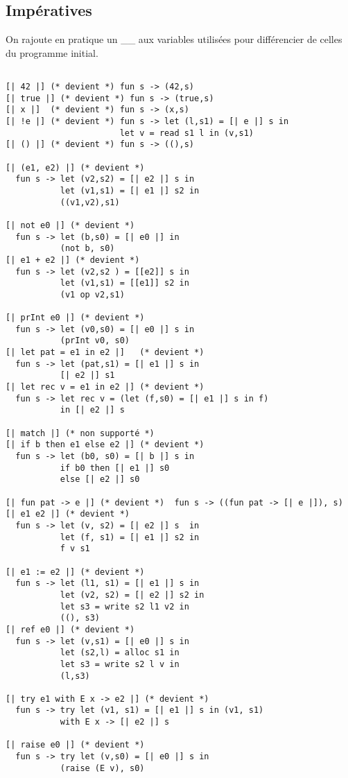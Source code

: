 \documentclass{article}
\newcommand\code[1]{{\fontfamily{lmtt}\selectfont #1}}
\begin{document}
\subsection{Impératives}

	On rajoute en pratique un \code{\_\_} aux variables utilisées pour différencier de celles du programme initial.
	
	\begin{verbatim}

[| 42 |] (* devient *) fun s -> (42,s)
[| true |] (* devient *) fun s -> (true,s)
[| x |]  (* devient *) fun s -> (x,s)
[| !e |] (* devient *) fun s -> let (l,s1) = [| e |] s in
                       let v = read s1 l in (v,s1)
[| () |] (* devient *) fun s -> ((),s)

[| (e1, e2) |] (* devient *) 
  fun s -> let (v2,s2) = [| e2 |] s in
           let (v1,s1) = [| e1 |] s2 in
           ((v1,v2),s1)

[| not e0 |] (* devient *) 
  fun s -> let (b,s0) = [| e0 |] in
           (not b, s0)
[| e1 + e2 |] (* devient *) 
  fun s -> let (v2,s2 ) = [[e2]] s in
           let (v1,s1) = [[e1]] s2 in
           (v1 op v2,s1)

[| prInt e0 |] (* devient *) 
  fun s -> let (v0,s0) = [| e0 |] s in
           (prInt v0, s0)
[| let pat = e1 in e2 |]   (* devient *) 
  fun s -> let (pat,s1) = [| e1 |] s in
           [| e2 |] s1
[| let rec v = e1 in e2 |] (* devient *) 
  fun s -> let rec v = (let (f,s0) = [| e1 |] s in f)
           in [| e2 |] s

[| match |] (* non supporté *)
[| if b then e1 else e2 |] (* devient *) 
  fun s -> let (b0, s0) = [| b |] s in
           if b0 then [| e1 |] s0
           else [| e2 |] s0
           
[| fun pat -> e |] (* devient *)  fun s -> ((fun pat -> [| e |]), s)
[| e1 e2 |] (* devient *) 
  fun s -> let (v, s2) = [| e2 |] s  in
           let (f, s1) = [| e1 |] s2 in
           f v s1

[| e1 := e2 |] (* devient *) 
  fun s -> let (l1, s1) = [| e1 |] s in
           let (v2, s2) = [| e2 |] s2 in
           let s3 = write s2 l1 v2 in
           ((), s3)
[| ref e0 |] (* devient *) 
  fun s -> let (v,s1) = [| e0 |] s in
           let (s2,l) = alloc s1 in
           let s3 = write s2 l v in
           (l,s3)
           
[| try e1 with E x -> e2 |] (* devient *) 
  fun s -> try let (v1, s1) = [| e1 |] s in (v1, s1)
           with E x -> [| e2 |] s
           
[| raise e0 |] (* devient *) 
  fun s -> try let (v,s0) = [| e0 |] s in
	       (raise (E v), s0)
	
	\end{verbatim}
	
\end{document}
